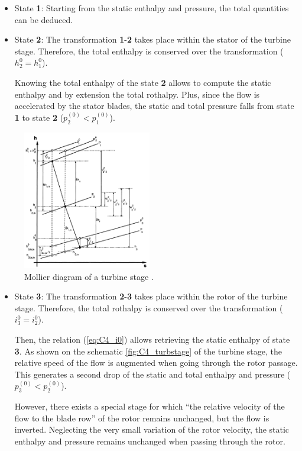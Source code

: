\begin{itemize}
    \item State \textbf{1}: Starting from the static enthalpy and pressure, the total quantities can be deduced.
    \item State \textbf{2}: The transformation \textbf{1}-\textbf{2} takes place within the stator of the turbine stage. Therefore, the total enthalpy is conserved over the transformation ($h_2^0=h_1^0$).

    Knowing the total enthalpy of the state \textbf{2} allows to compute the static enthalpy and by extension the total rothalpy. Plus, since the flow is accelerated by the stator blades, the static and total pressure falls from state \textbf{1} to state \textbf{2} (\(p_2^{(0)}<p_1^{(0)}\)).
\end{itemize}

\begin{figure}[h]
    \centering
    \includegraphics[width=0.5\textwidth]{Turb_mollier.png}
    \caption{Mollier diagram of a turbine stage \cite{Hillewaert2019}.}
    \label{fig:C4_Mollierturb}
\end{figure}

\begin{itemize}
    \item State \textbf{3}: The transformation \textbf{2}-\textbf{3} takes place within the rotor of the turbine stage. Therefore, the total rothalpy is conserved over the transformation (\(i_3^0=i_2^0\)).

    Then, the relation (\ref{eq:C4_i0}) allows retrieving the static enthalpy of state \textbf{3}. As shown on the schematic \ref{fig:C4_turbstage} of the turbine stage, the relative speed of the flow is augmented when going through the rotor passage. This generates a second drop of the static and total enthalpy and pressure (\(p_3^{(0)}<p_2^{(0)}\)).

    However, there exists a special stage for which “the relative velocity of the flow to the blade row” of the rotor\cite{Hillewaert2019} remains unchanged, but the flow is inverted. Neglecting the very small variation of the rotor velocity, the static enthalpy and pressure remains unchanged when passing through the rotor.
\end{itemize}


